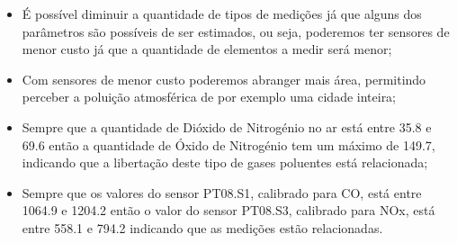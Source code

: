 \begin{itemize}
	\item É possível diminuir a quantidade de tipos de medições já que alguns dos parâmetros são possíveis de ser estimados, ou seja, poderemos ter sensores de menor custo já que a quantidade de elementos a medir será menor;
	\item Com sensores de menor custo poderemos abranger mais área, permitindo perceber a poluição atmosférica de por exemplo uma cidade inteira;
	\item Sempre que a quantidade de Dióxido de Nitrogénio no ar está entre 35.8 e 69.6 então a quantidade de Óxido de Nitrogénio tem um máximo de 149.7, indicando que a libertação deste tipo de gases poluentes está relacionada;
	\item Sempre que os valores do sensor PT08.S1, calibrado para CO, está entre 1064.9 e 1204.2 então o valor do sensor PT08.S3, calibrado para NOx, está entre 558.1 e 794.2 indicando que as medições estão relacionadas.
\end{itemize}